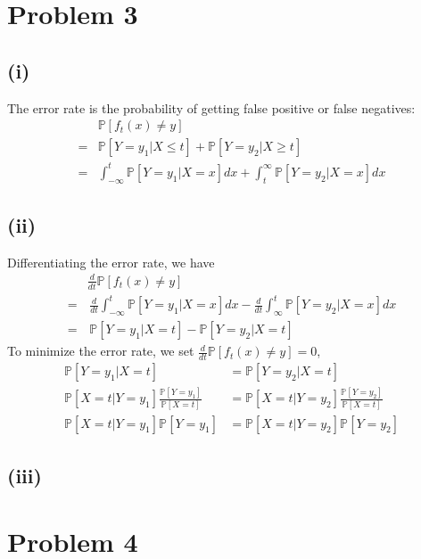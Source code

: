 \documentclass[twoside,11pt]{homework}
\date{02/21/2020}
\begin{document}
\maketitle



\section*{Problem 3} 
\subsection*{(i)}
	The error rate is the probability of getting false positive or false negatives:
	\begin{align*}
		& \mathbb{P}[f_t(x)\neq y] \\
		=& \mathbb{P}[Y=y_1 | X\leq t] + \mathbb{P}[Y=y_2 | X\geq t] \\
		=& \int_{-\infty}^t  \mathbb{P}[Y=y_1 | X=x] dx + \int_{t}^\infty  \mathbb{P}[Y=y_2 | X=x] dx
	\end{align*}
\subsection*{(ii)}
	Differentiating the error rate, we have
	\begin{align*}
		& \frac{d}{dt} \mathbb{P}[f_t(x)\neq y]  \\
		=& \, \frac{d}{dt}\int_{-\infty}^t  \mathbb{P}[Y=y_1 | X=x] dx - \frac{d}{dt} \int_{\infty}^t  \mathbb{P}[Y=y_2 | X=x] dx \\
		=&\,  \mathbb{P}[Y=y_1 | X=t] - \mathbb{P}[Y=y_2 | X=t] \tag{Foundamental Theorem of Calculus}
	\end{align*}
	To minimize the error rate, we set $\frac{d}{dt} \mathbb{P}[f_t(x)\neq y] = 0$,
	\begin{align*}
		\mathbb{P}[Y=y_1 | X=t] &= \mathbb{P}[Y=y_2 | X=t] \\
		\mathbb{P}[ X=t | Y=y_1 ] \frac{ \mathbb{P}[ Y=y_1 ]}{ \mathbb{P}[ X=t]}
		&= \mathbb{P}[ X=t | Y=y_2 ] \frac{ \mathbb{P}[ Y=y_2 ]}{ \mathbb{P}[ X=t]} \tag{Bayes Rule}\\
		\mathbb{P}[ X=t | Y=y_1 ] \mathbb{P}[ Y=y_1 ] 
		&= \mathbb{P}[ X=t | Y=y_2 ] \mathbb{P}[ Y=y_2 ]
	\end{align*}
\subsection*{(iii)}


\section*{Problem 4} 
\end{document}
